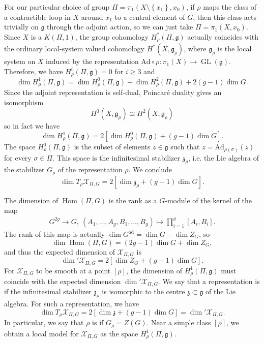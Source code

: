 \documentclass[12pt,a4paper]{amsbook}
\theoremstyle{remark} \newtheorem{rmk}[thm]{Remark}
\theoremstyle{definition} \newtheorem{defn}[thm]{Definition}
\theoremstyle{definition} \newtheorem{ex}[thm]{Example}
\theoremstyle{definition} \newtheorem{ej}{Exercise}
\let\emph\relax
\newcommand{\cX}{\mathcal X}
\newcommand{\fg}{\mathfrak{g}}
\newcommand{\Ad}{\mathrm{Ad}}
\newcommand{\ad}{\mathrm{ad}}
\DeclareMathOperator{\Hom}{Hom}
\DeclareMathOperator{\GL}{GL}
\begin{document}
For our particular choice of group $\Pi=\pi_1(X \setminus \left\{ x_1 \right\},x_0)$, if $\rho$ maps the class of a contractible loop in $X$ around $x_1$ to a central element of $G$, then this class acts trivially on $\fg$ through the adjoint action, so we can just take $\Pi=\pi_1(X,x_0)$. Since $X$ is a $K(\Pi,1)$, the group cohomology $H_\rho^*(\Pi,\fg)$ actually coincides with the ordinary local-system valued cohomology $H^*(X,\fg_\rho)$, where $\fg_\rho$ is the local system on $X$ induced by the representation $\Ad \circ \rho:\pi_1(X)\rightarrow \GL(\fg)$. Therefore, we have $H^i_\rho(\Pi,\fg)=0$ for $i\geq 3$ and
\begin{equation*}
\dim H^1_\rho(\Pi,\fg) = \dim H^0_\rho(\Pi,\fg) + \dim H^2_\rho (\Pi,\fg) + 2(g-1) \dim G.
\end{equation*}
Since the adjoint representation is self-dual, Poincaré duality gives an isomorphism
\begin{equation*}
H^0(X,\fg_\rho) \cong H^2(X,\fg_\rho)
\end{equation*}
so in fact we have
\begin{equation*}
\dim H^1_\rho(\Pi,\fg) = 2[\dim H^0_\rho(\Pi,\fg) + (g-1) \dim G].
\end{equation*}
The space $H^0_\rho(\Pi,\fg)$ is the subset of elements $z \in \fg$ such that $z=\Ad_{\rho(\sigma)}(z)$ for every $\sigma \in \Pi$. This space is the infinitesimal stabilizer $\mathfrak{z}_\rho$, i.e. the Lie algebra of the stabilizer $G_\rho$ of the representation $\rho$. We conclude
\begin{equation*}
\dim T_\rho \cX_{\Pi,G} = 2[ \dim \mathfrak{z}_\rho + (g-1) \dim G].
\end{equation*}


The dimension of $\Hom(\Pi,G)$ is the rank as a $G$-module of the kernel of the map
\begin{align*}
  G^{2g}  \longrightarrow G,\ (A_1,\dots,A_g,B_1,\dots,B_g)   \longmapsto \prod_{i=1}^g [A_i,B_i].
\end{align*}
The rank of this map is actually $\dim G^{\ad}=\dim G - \dim Z_G$, so
\begin{equation*}
\dim \Hom(\Pi,G) = (2g-1) \dim G + \dim Z_G,
\end{equation*}
and thus the expected dimension of $\cX_{\Pi,G}$ is
\begin{equation*}
\dim' \cX_{\Pi,G}=2[\dim Z_G + (g-1)\dim G ].
\end{equation*}
For $\cX_{\Pi,G}$  to be smooth at a point $[\rho]$, the dimension of $H^1_\rho(\Pi,\fg)$ must coincide with the expected dimension $\dim' \cX_{\Pi,G}$. We say that a representation is \emph{infinitesimally simple} if the infinitesimal stabilizer $\mathfrak{z}_\rho$ is isomorphic to the centre $\mathfrak{z}\subset \fg$ of the Lie algebra. For such a representation, we have
\begin{equation*}
\dim T_\rho \cX_{\Pi,G} = 2 [\dim \mathfrak{z} + (g-1) \dim G] = \dim' \cX_{\Pi,G}.
\end{equation*}
In particular, we say that $\rho$ is \emph{simple} if $G_\rho=Z(G)$. Near a simple class $[\rho]$, we obtain a local model for $\cX_{\Pi,G}$ as the space $H^1_\rho(\Pi,\fg)$.
\end{document}

